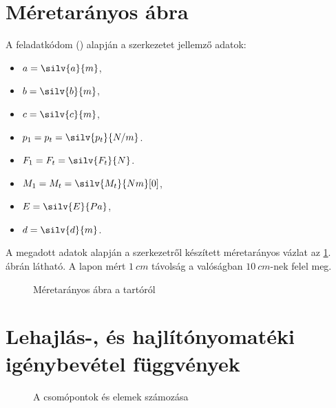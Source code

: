 \documentclass[a4paper, 12pt]{scrartcl}
\begin{document}


\section{Méretarányos ábra} %
\label{sec:Méretarányos ábra}

A feladatkódom (\texttt{})
alapján a szerkezetet jellemző adatok:
\begin{multicols}{3}
  \begin{itemize}
    \item $a = \silv{a}{m}$,
    \item $b = \silv{b}{m}$,
    \item $c = \silv{c}{m}$,

    \item $p_1 = p_t = \silv{p_t}{N/m}$.
    \item $F_1 = F_t = \silv{F_t}{N}$.
    \item $M_1 = M_t = \silv{M_t}{Nm}[0]$,

    \item $\siplaces{0}\sisci{}E = \silv{E}{Pa}$,
    \item $d = \silv{d}{m}$.
  \end{itemize}
\end{multicols}

A megadott adatok alapján a szerkezetről készített méretarányos vázlat az
\ref{fig:construction}. ábrán látható. A lapon mért $\SI{1}{cm}$ távolság
a valóságban $\SI{10}{cm}$-nek felel meg.

\begin{figure}[H]
  \centering
  
  \caption{Méretarányos ábra a tartóról}
  \label{fig:construction}
\end{figure}




\section{Lehajlás-, és hajlítónyomatéki igénybevétel függvények} %
\label{sec:Lehajlás- és hajlítónyomatéki igénybevétel függvények}

\begin{figure}[H]
  \centering
  
  \vspace{-2mm}
  \caption{A csomópontok és elemek számozása}
  \label{fig:numbering}
\end{figure}
\end{document}
